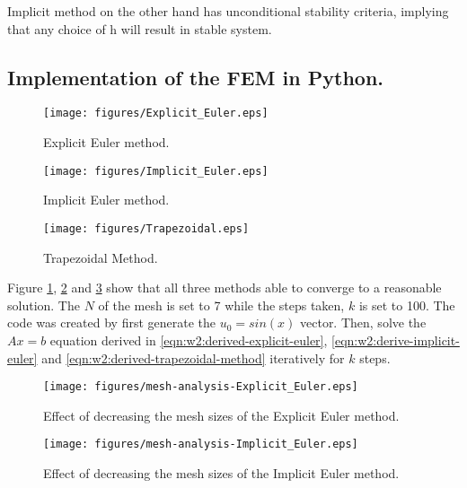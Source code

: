 \documentclass{article}
\begin{document}
Implicit method on the other hand has unconditional stability criteria, implying that any choice of h will result in stable system.





\subsection{Implementation of the FEM in Python.}%
\label{sub:Implementation of the FEM in Python.}
\begin{figure}[H]
  \centering
  \texttt{[image: figures/Explicit\_Euler.eps]}
  \caption{Explicit Euler method.}
  \label{fig:figures-Explicit_Euler-eps}
\end{figure}

\begin{figure}[H]
  \centering
  \texttt{[image: figures/Implicit\_Euler.eps]}
  \caption{Implicit Euler method.}
  \label{fig:figures-Implicit_Euler-eps}
\end{figure}

\begin{figure}[H]
  \centering
  \texttt{[image: figures/Trapezoidal.eps]}
  \caption{Trapezoidal Method.}
  \label{fig:figures-Trapezoidal-eps}
\end{figure}
Figure \ref{fig:figures-Explicit_Euler-eps}, \ref{fig:figures-Implicit_Euler-eps} and
\ref{fig:figures-Trapezoidal-eps} show that all three methods able to converge to a reasonable
solution. The $N$ of the mesh is set to 7 while the steps taken, $k$ is set to 100. The code was
created by first generate the $u_0 = sin(x)$ vector. Then, solve the $Ax = b$ equation derived 
in \ref{eqn:w2:derived-explicit-euler}, \ref{eqn:w2:derive-implicit-euler} and 
\ref{eqn:w2:derived-trapezoidal-method} iteratively for $k$ steps.


\begin{figure}[H]
  \centering
  \texttt{[image: figures/mesh-analysis-Explicit\_Euler.eps]}
  \caption{Effect of decreasing the mesh sizes of the Explicit Euler method.}
  \label{fig:figures-mesh-analysis-Explicit_Euler-eps}
\end{figure}

\begin{figure}[H]
  \centering
  \texttt{[image: figures/mesh-analysis-Implicit\_Euler.eps]}
  \caption{Effect of decreasing the mesh sizes of the Implicit Euler method.}
  \label{fig:figures-mesh-analysis-Implicit_Euler-eps}
\end{figure}
\end{document}
